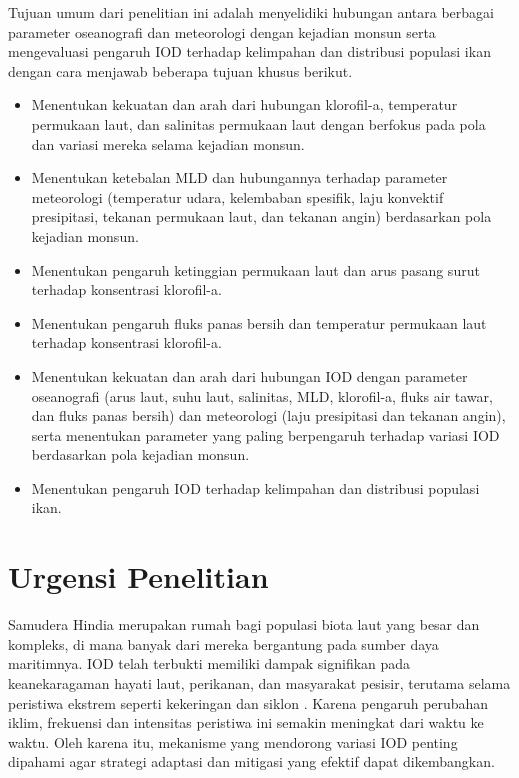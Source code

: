 \begin{spacing}{1.5}
	Tujuan umum dari penelitian ini adalah menyelidiki hubungan antara berbagai parameter oseanografi dan meteorologi dengan kejadian monsun serta mengevaluasi pengaruh IOD terhadap kelimpahan dan distribusi populasi ikan dengan cara menjawab beberapa tujuan khusus berikut.
	
	\begin{itemize}
		\item  Menentukan kekuatan dan arah dari hubungan klorofil-a, temperatur permukaan laut, dan salinitas permukaan laut dengan berfokus pada pola dan variasi mereka selama kejadian monsun.
		
		\item Menentukan ketebalan MLD dan hubungannya terhadap parameter meteorologi (temperatur udara, kelembaban spesifik, laju konvektif presipitasi, tekanan permukaan laut, dan tekanan angin) berdasarkan pola kejadian monsun.
		
		\item Menentukan pengaruh ketinggian permukaan laut dan arus pasang surut terhadap konsentrasi klorofil-a.
		
		\item Menentukan pengaruh fluks panas bersih dan temperatur permukaan laut terhadap konsentrasi klorofil-a.
		
		\item Menentukan kekuatan dan arah dari hubungan IOD dengan parameter oseanografi (arus laut, suhu laut, salinitas, MLD, klorofil-a, fluks air tawar, dan fluks panas bersih) dan meteorologi (laju presipitasi dan tekanan angin), serta menentukan parameter yang paling berpengaruh terhadap variasi IOD berdasarkan pola kejadian monsun.
		
		\item Menentukan pengaruh IOD terhadap kelimpahan dan distribusi populasi ikan.
		
	\end{itemize}
	\section[Urgensi Penelitian]{Urgensi Penelitian}

	Samudera Hindia merupakan rumah bagi populasi biota laut yang besar dan kompleks, di mana banyak dari mereka bergantung pada sumber daya maritimnya. IOD telah terbukti memiliki dampak signifikan pada keanekaragaman hayati laut, perikanan, dan masyarakat pesisir, terutama selama peristiwa ekstrem seperti kekeringan \cite{Pan2018} dan siklon \cite{Wahiduzzaman2022}. Karena pengaruh perubahan iklim, frekuensi dan intensitas peristiwa ini semakin meningkat dari waktu ke waktu. Oleh karena itu, mekanisme yang mendorong variasi IOD penting dipahami agar strategi adaptasi dan mitigasi yang efektif dapat dikembangkan.
	

\end{spacing}
